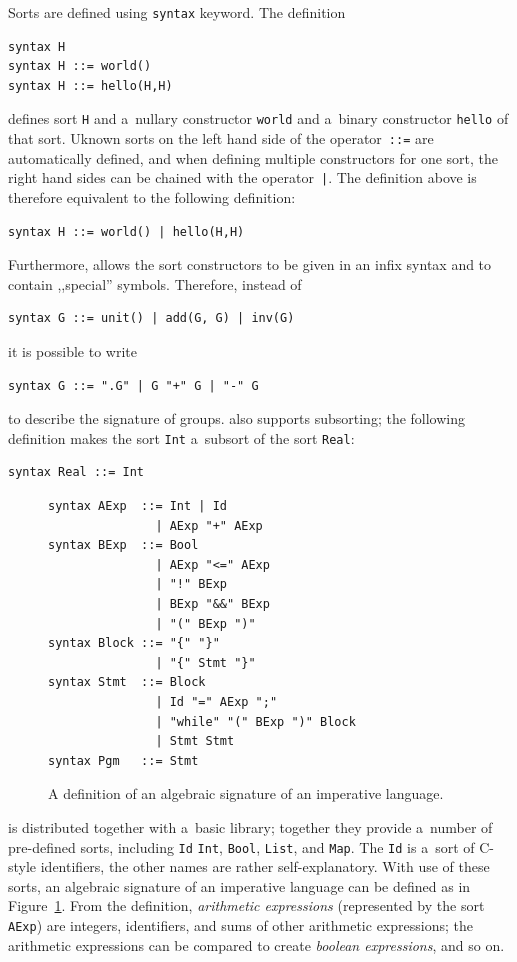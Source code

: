 \documentclass{fithesis3}
\begin{document}
Sorts are defined using \texttt{syntax} keyword. The definition
\begin{lstlisting}
syntax H
syntax H ::= world()
syntax H ::= hello(H,H)
\end{lstlisting}
defines sort \texttt{H} and a~nullary constructor \texttt{world} and a~binary constructor \texttt{hello} of that sort. Uknown sorts on the left hand side of the operator~\texttt{::=} are automatically defined, and when defining multiple constructors for one sort, the right hand sides can be chained with the operator~\texttt{|}. The definition above is therefore equivalent to the following definition:
\begin{lstlisting}
syntax H ::= world() | hello(H,H)
\end{lstlisting}
Furthermore, \K allows the sort constructors to be given in an infix syntax and to contain ,,special'' symbols. Therefore, instead of
\begin{lstlisting}
syntax G ::= unit() | add(G, G) | inv(G)
\end{lstlisting}
it is possible to write
\begin{lstlisting}
syntax G ::= ".G" | G "+" G | "-" G
\end{lstlisting}
to describe the signature of groups. \K also supports subsorting; the following definition makes the sort \texttt{Int} a~subsort of the sort \texttt{Real}:
\begin{lstlisting}
syntax Real ::= Int
\end{lstlisting}

\begin{figure}[h]
\begin{lstlisting}
syntax AExp  ::= Int | Id
               | AExp "+" AExp
syntax BExp  ::= Bool
               | AExp "<=" AExp
               | "!" BExp
               | BExp "&&" BExp
               | "(" BExp ")"
syntax Block ::= "{" "}"
               | "{" Stmt "}"
syntax Stmt  ::= Block
               | Id "=" AExp ";"
               | "while" "(" BExp ")" Block
               | Stmt Stmt
syntax Pgm   ::= Stmt
\end{lstlisting}
\caption{A definition of an algebraic signature of an imperative language.}
\label{impSyntax}
\end{figure}

\K is distributed together with a~basic library; together they provide a~number of pre-defined sorts, including \texttt{Id} \texttt{Int}, \texttt{Bool}, \texttt{List}, and \texttt{Map}. The \texttt{Id} is a~sort of C-style identifiers, the other names are rather self-explanatory. With use of these sorts, an algebraic signature of an imperative language can be defined as in Figure~\ref{impSyntax}. From the definition, \textit{arithmetic expressions} (represented by the sort \texttt{AExp}) are integers, identifiers, and sums of other arithmetic expressions; the arithmetic expressions can be compared to create \textit{boolean expressions}, and so on.
\end{document}
